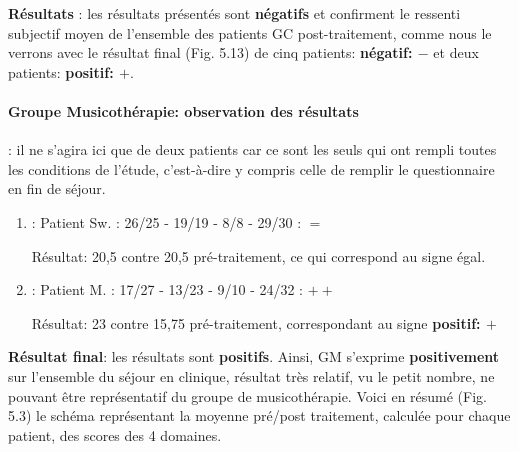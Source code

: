    \textbf{ Résultats }: les résultats présentés sont  \textbf{négatifs} 
   et confirment le ressenti subjectif moyen de l'ensemble des patients
   GC post-traitement,  comme nous le verrons avec  le résultat final  (Fig. 5.13) de
   cinq patients:  \textbf{négatif:  $-$} et deux patients:  \textbf{positif:  $+$}.
   
\paragraph {Groupe Musicothérapie: observation des résultats}
: il ne s'agira ici que de  deux patients car ce sont les seuls qui ont rempli toutes les conditions de 
l'étude, 
 c'est-à-dire y compris celle de remplir le questionnaire en fin de séjour.
 
 \begin{enumerate}
 	\item :  Patient Sw. : 26/25 - 19/19 - 8/8 - 29/30 :   $=$
 	
 	
 	
 	Résultat: 20,5 contre 20,5 pré-traitement, ce qui
 	correspond au signe égal.
 	
 	
 	
 	\item : Patient M. : 17/27 - 13/23 -  9/10 - 24/32 :  $++$
 	
 	Résultat: 23 contre 15,75 pré-traitement, correspondant
 	au signe \textbf{positif: $+$}
 \end{enumerate}
 \textbf{ Résultat final}: les résultats sont \textbf{positifs}.
 Ainsi,  GM s'exprime
 \textbf{positivement}
 sur l'ensemble du séjour en clinique, résultat très relatif, vu le petit nombre, ne pouvant être  
 représentatif du 
 groupe de 
 musicothérapie.
 Voici en résumé (Fig. 5.3) le schéma représentant la moyenne pré/post traitement, calculée pour chaque 
 patient, des scores des 4 domaines.
 
